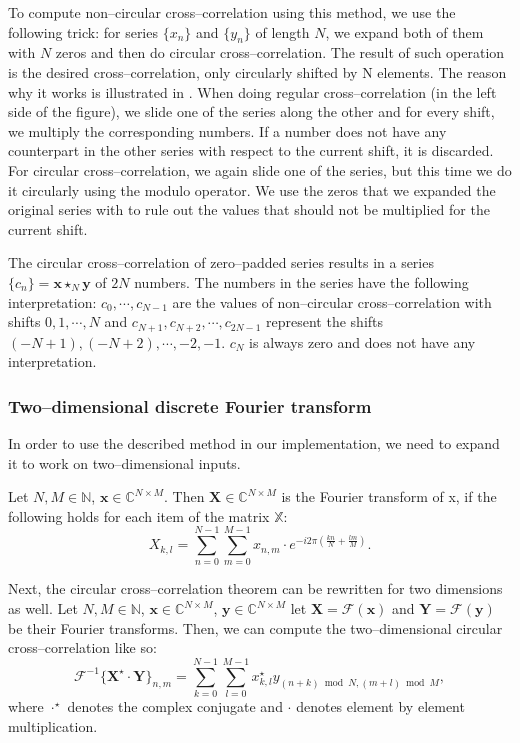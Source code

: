 To compute non--circular cross--correlation using this method, we use the following trick: for series $\{x_n\}$ and $\{y_n\}$ of length $N$, we expand both of them with $N$ zeros and then do circular cross--correlation. The result of such operation is the desired cross--correlation, only circularly shifted by N elements. The reason why it works is illustrated in . When doing regular cross--correlation (in the left side of the figure), we slide one of the series along the other and for every shift, we multiply the corresponding numbers. If a number does not have any counterpart in the other series with respect to the current shift, it is discarded. For circular cross--correlation, we again slide one of the series, but this time we do it circularly using the modulo operator. We use the zeros that we expanded the original series with to rule out the values that should not be multiplied for the current shift.

The circular cross--correlation of zero--padded series results in a series $\{c_n\} = \mathbf{x} \star_N \mathbf{y}$ of $2N$ numbers. The numbers in the series have the following interpretation: $c_0, \cdots, c_{N-1}$ are the values of non--circular cross--correlation with shifts $0, 1, \cdots, N$ and $c_{N+1}, c_{N+2}, \cdots, c_{2N-1}$ represent the shifts $(-N+1), (-N+2), \cdots, -2, -1$. $c_{N}$ is always zero and does not have any interpretation.

\subsubsection{Two--dimensional discrete Fourier transform}

In order to use the described method in our implementation, we need to expand it to work on two--dimensional inputs.

Let $N, M \in \mathbb{N}$, $\mathbf{x} \in \mathbb{C}^{N\times M}$. Then $\mathbf{X} \in \mathbb{C}^{N\times M}$ is the Fourier transform of x, if the following holds for each item of the matrix $\mathbb{X}$:
\[
X_{k,l} = \sum_{n=0}^{N-1} \sum_{m=0}^{M-1} x_{n,m} \cdot e^{-i2\pi(\frac{kn}{N} + \frac{lm}{M})}.
\]

Next, the circular cross--correlation theorem can be rewritten for two dimensions as well. Let $N, M \in \mathbb{N}$, $\mathbf{x} \in \mathbb{C}^{N\times M}$, $\mathbf{y} \in \mathbb{C}^{N\times M}$ let $\mathbf{X} = \mathcal{F}(\mathbf{x})$ and $\mathbf{Y} = \mathcal{F}(\mathbf{y})$ be their Fourier transforms. Then, we can compute the two--dimensional circular cross--correlation like so: 
\[
\mathcal{F}^{-1}\{\mathbf{X}^\star \cdot \mathbf{Y}\}_{n,m} = \sum_{k=0}^{N-1} \sum_{l=0}^{M-1} x^\star_{k,l} y_{(n+k)\bmod N, (m+l)\bmod M},
\]
where $\cdot^\star$ denotes the complex conjugate and $\cdot$ denotes element by element multiplication.

